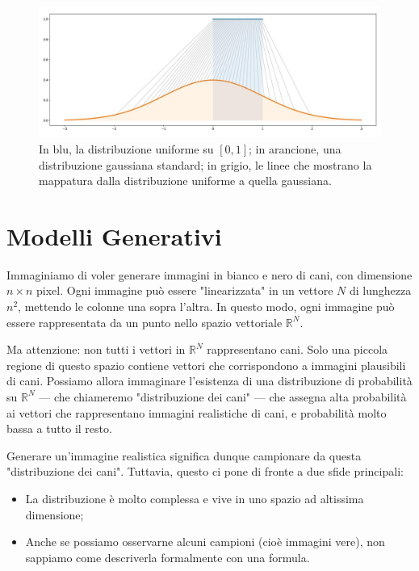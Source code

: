 \begin{figure}
\centering
\includegraphics[width=\textwidth]{figure/InvTrasf.png}
\caption{In blu, la distribuzione uniforme su $[0,1]$; in arancione, una distribuzione gaussiana standard; in grigio, le linee che mostrano la mappatura dalla distribuzione uniforme a quella gaussiana.}
\label{fig:invTrasf}
\end{figure}

\section{Modelli Generativi}

Immaginiamo di voler generare immagini in bianco e nero di cani, con dimensione $n \times n$ pixel. Ogni immagine può essere "linearizzata" in un vettore $N$ di lunghezza $n^2$, mettendo le colonne una sopra l’altra. In questo modo, ogni immagine può essere rappresentata da un punto nello spazio vettoriale $\mathbb{R}^N$.

Ma attenzione: non tutti i vettori in $\mathbb{R}^N$ rappresentano cani. Solo una piccola regione di questo spazio contiene vettori che corrispondono a immagini plausibili di cani. Possiamo allora immaginare l’esistenza di una distribuzione di probabilità su $\mathbb{R}^N$ — che chiameremo "distribuzione dei cani" — che assegna alta probabilità ai vettori che rappresentano immagini realistiche di cani, e probabilità molto bassa a tutto il resto.

Generare un'immagine realistica significa dunque campionare da questa "distribuzione dei cani". Tuttavia, questo ci pone di fronte a due sfide principali:
\begin{itemize}
    \item La distribuzione è molto complessa e vive in uno spazio ad altissima dimensione;
    \item Anche se possiamo osservarne alcuni campioni (cioè immagini vere), non sappiamo come descriverla formalmente con una formula.
\end{itemize}

